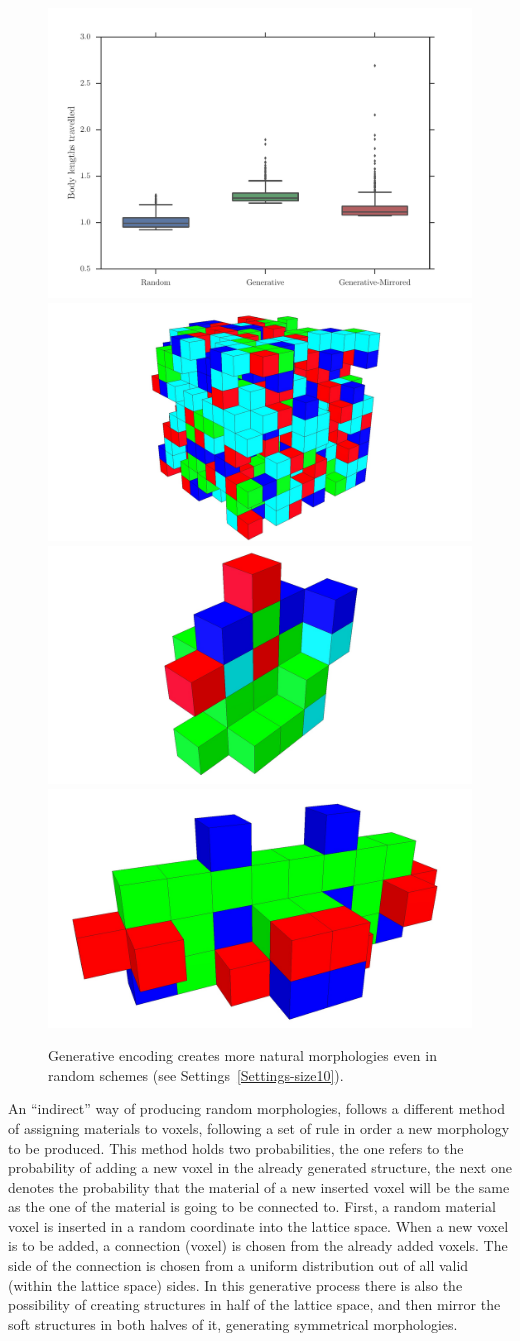 \begin{figure}
\centering
\includegraphics[width=1.0\textwidth]{../Figures/Results/random.pdf}\\
\hspace{0.1cm}
\includegraphics[height=0.15\textwidth]{../Figures/Robots/random.jpg}
\includegraphics[height=0.15\textwidth]{../Figures/Robots/rg0.jpg}
\includegraphics[height=0.15\textwidth]{../Figures/Robots/rg1.jpg}
\caption{Generative encoding creates more natural morphologies even in random schemes (see Settings~\ref{Settings-size10}).}
\label{fig:randomResultsRobots}
\end{figure}

An ``indirect'' way of producing random morphologies, follows a different method of assigning materials to voxels, following a set of rule in order a new morphology to be produced. This method holds two probabilities, the one refers to the probability of adding a new voxel in the already generated structure, the next one denotes the probability that the material of a new inserted voxel will be the same as the one of the material is going to be connected to. First, a random material voxel is inserted in a random coordinate into the lattice space. When a new voxel is to be added, a connection (voxel) is chosen from the already added voxels. The side of the connection is chosen from a uniform distribution out of all valid (within the lattice space) sides. In this generative process there is also the possibility of creating structures in half of the lattice space, and then mirror the soft structures in both halves of it, generating symmetrical morphologies.

